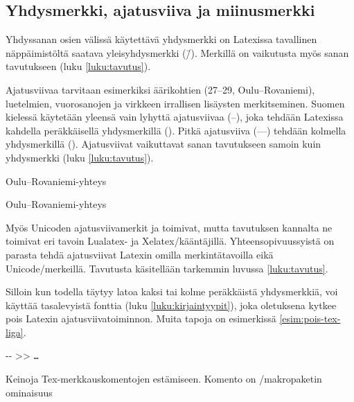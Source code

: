\subsection{Yhdysmerkki, ajatusviiva ja miinusmerkki}

Yhdyssanan osien välissä käytettävä yhdysmerkki on Latexissa tavallinen
näppäimistöltä saatava yleis\-yh\-dys\-merk\-ki (\=/). Merkillä on
vaikutusta myös sanan tavutukseen (luku \ref{luku:tavutus}).

Ajatusviivaa tarvitaan esimerkiksi äärikohtien (27--29,
Oulu--Rova\-niemi), luetelmien, vuorosanojen ja virkkeen irrallisen
lisäysten merkitseminen. Suomen kielessä käytetään yleensä vain lyhyttä
ajatusviivaa \mbox{(--)}, joka tehdään Latexissa kahdella peräkkäisellä
yhdysmerkillä \mbox{(\koodi{--})}. Pitkä ajatusviiva \mbox{(---)}
tehdään kolmella yhdysmerkillä \mbox{(\koodi{---})}. Ajatusviivat
vaikuttavat sanan tavutukseen samoin kuin yhdysmerkki (luku
\ref{luku:tavutus}).

\pagebreak[3]

\begin{koodilohkosis}
  Oulu--Rovaniemi-yhteys
\end{koodilohkosis}

\begin{tulossis}
  Oulu--Rovaniemi-yhteys
\end{tulossis}

Myös Unicoden ajatusviivamerkit  ja
 toimivat, mutta tavutuksen kannalta ne
toimivat eri tavoin Lua\-latex- ja Xelatex\-/kääntäjillä.
Yhteensopivuussyistä on parasta tehdä ajatusviivat Latexin omilla
merkintätavoilla eikä Unicode\-/merkeillä. Tavutusta käsitellään
tarkemmin luvussa \ref{luku:tavutus}.

Silloin kun todella täytyy latoa kaksi tai kolme peräkkäistä
yhdysmerkkiä, voi käyttää tasalevyistä fonttia (luku
\ref{luku:kirjaintyypit}), joka oletuksena kytkee pois Latexin
ajatusviivatoiminnon. Muita tapoja on esimerkissä
\ref{esim:pois-tex-liga}.

\begin{esimerkki*}
\begin{koodilohko}
  -{}-       %
  >{}>       %
  \texttt{…} %
\end{koodilohko}
\caption{Keinoja Tex-merkkauskomentojen estämiseen. Komento  on \-/makropaketin
  ominaisuus}
\label{esim:pois-tex-liga}
\end{esimerkki*}

